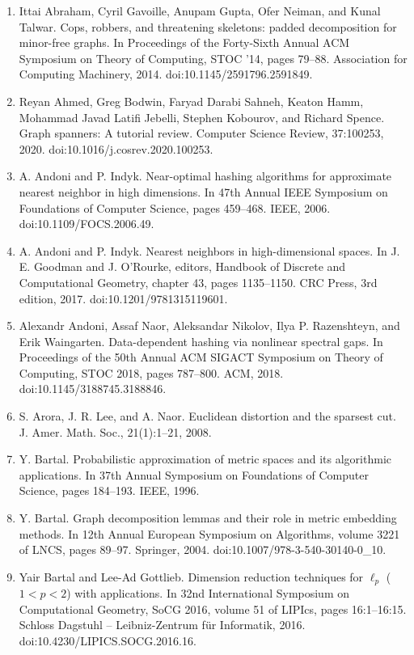 \begin{enumerate}
\item[]  [1]  Ittai Abraham, Cyril Gavoille, Anupam Gupta, Ofer Neiman, and Kunal Talwar.  Cops, robbers, and threatening skeletons: padded decomposition for minor-free graphs.  In Proceedings of the Forty-Sixth Annual ACM Symposium on Theory of Computing, STOC ’14, pages 79–88. Association for Computing Machinery, 2014.  doi:10.1145/2591796.2591849.  
\item[]  [2]  Reyan Ahmed, Greg Bodwin, Faryad Darabi Sahneh, Keaton Hamm, Mohammad Javad Latifi Jebelli, Stephen Kobourov, and Richard Spence.  Graph spanners: A tutorial review.  Computer Science Review, 37:100253, 2020.  doi:10.1016/j.cosrev.2020.100253.  
\item[]  [3]  A. Andoni and P. Indyk.  Near-optimal hashing algorithms for approximate nearest neighbor in high dimensions.  In 47th Annual IEEE Symposium on Foundations of Computer Science, pages 459–468. IEEE, 2006.  doi:10.1109/FOCS.2006.49.  
\item[]  [4]  A. Andoni and P. Indyk.  Nearest neighbors in high-dimensional spaces.  In J. E. Goodman and J. O’Rourke, editors, Handbook of Discrete and Computational Geometry, chapter 43, pages 1135–1150. CRC Press, 3rd edition, 2017.  doi:10.1201/9781315119601.  
\item[]  [5]  Alexandr Andoni, Assaf Naor, Aleksandar Nikolov, Ilya P. Razenshteyn, and Erik Waingarten.  Data-dependent hashing via nonlinear spectral gaps.  In Proceedings of the 50th Annual ACM SIGACT Symposium on Theory of Computing, STOC 2018, pages 787–800. ACM, 2018.  doi:10.1145/3188745.3188846.  
\item[]  [6]  S. Arora, J. R. Lee, and A. Naor.  Euclidean distortion and the sparsest cut.  J. Amer. Math. Soc., 21(1):1–21, 2008.  
\item[]  [7]  Y. Bartal.  Probabilistic approximation of metric spaces and its algorithmic applications.  In 37th Annual Symposium on Foundations of Computer Science, pages 184–193. IEEE, 1996.  
\item[]  [8]  Y. Bartal.  Graph decomposition lemmas and their role in metric embedding methods.  In 12th Annual European Symposium on Algorithms, volume 3221 of LNCS, pages 89–97. Springer, 2004.  doi:10.1007/978-3-540-30140-0\_10.  
\item[]  [9]  Yair Bartal and Lee-Ad Gottlieb.  Dimension reduction techniques for $\ell_{p}$ ($1<p<2$) with applications.  In 32nd International Symposium on Computational Geometry, SoCG 2016, volume 51 of LIPIcs, pages 16:1–16:15. Schloss Dagstuhl – Leibniz-Zentrum für Informatik, 2016.  doi:10.4230/LIPICS.SOCG.2016.16.  

\end{enumerate}
